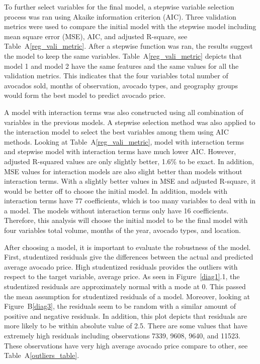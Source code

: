 \documentclass[11pt]{article}\usepackage[]{graphicx}\usepackage[]{color}
\begin{document}
\noindent To further select variables for the final model, a stepwise variable selection process was ran using Akaike information criterion (AIC). Three validation metrics were used to compare the initial model with the stepwise model including mean square error (MSE), AIC, and adjusted R-square, see Table~A\ref{reg_vali_metric}. After a stepwise function was ran, the results suggest the model to keep the same variables. Table~A\ref{reg_vali_metric} depicts that model 1 and model 2 have the same features and the same values for all the validation metrics. This indicates that the four variables total number of avocados sold, months of observation, avocado types, and geography groups would form the best model to predict avocado price.
\hfill \break

\noindent A model with interaction terms was also constructed using all combination of variables in the previous models. A stepwise selection method was also applied to the interaction model to select the best variables among them using AIC methods. Looking at Table~A\ref{reg_vali_metric}, model with interaction terms and stepwise model with interaction terms have much lower AIC. However, adjusted R-squared values are only slightly better, 1.6\% to be exact. In addition, MSE values for interaction models are also slight better than models without interaction terms. With a slightly better values in MSE and adjusted R-square, it would be better off to choose the initial model. In addition, models with interaction terms have 77 coefficients, which is too many variables to deal with in a model. The models without interaction terms only have 16 coefficients. Therefore, this analysis will choose the initial model to be the final model with four variables total volume, months of the year, avocado types, and location.      
\hfill \break

\noindent After choosing a model, it is important to evaluate the robustness of the model. First, studentized residuals give the differences between the actual and predicted average avocado price. High studentized residuals provides the outliers with respect to the target variable, average price. As seen in Figure~\ref{diag1}.1, the studentized residuals are approximately normal with a mode at 0. This passed the mean assumption for studentized residuals of a model. Moreover, looking at Figure~B\ref{diag3}, the residuals seem to be random with a similar amount of positive and negative residuals. In addition, this plot depicts that residuals are more likely to be within absolute value of 2.5. There are some values that have extremely high residuals including observations 7339, 9608, 9640, and 11523. These observations have very high average avocado price compare to other, see Table~A\ref{outliers_table}.      
\end{document}
